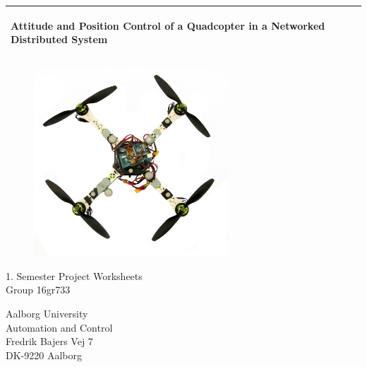 %
\begin{titlepage}
  \addtolength{\hoffset}{0.5\evensidemargin-0.5\oddsidemargin} %
  \noindent%
  \begin{tabular}{@{}p{\textwidth}@{}}
    \toprule[2pt]
    \midrule
    \vspace{0.2cm}
    \begin{center}
    \Huge{\textbf{
      Attitude and Position Control of a Quadcopter in a Networked Distributed System}}
    \end{center}
	\vspace{0.2cm} \\
    \midrule
    \toprule[2pt]
  \end{tabular}
   \vspace{0.55 cm}
  \begin{figure}[!ht]
\centering
\includegraphics[width=0.65\textwidth]{figures/quadcopter}
\label{fig:forside}
\end{figure}
  \vspace{0.6 cm}
  \begin{center}
    {\large
      1. Semester Project Worksheets %
    }\\
    \vspace{0.2cm}
    {\Large
      Group 16gr733%
    }
  \end{center}
  \begin{center}
  Aalborg University\\
  Automation and Control\\
  Fredrik Bajers Vej 7\\
  DK-9220 Aalborg
  \end{center}
\end{titlepage}

\clearpage